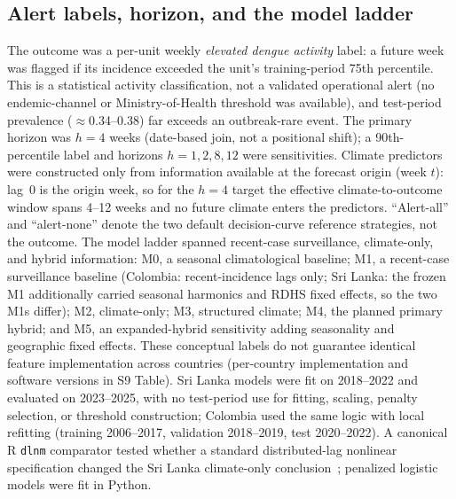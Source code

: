 \documentclass[11pt,a4paper]{article}
\begin{document}
\subsection{Alert labels, horizon, and the model ladder}
The outcome was a per-unit weekly \emph{elevated dengue activity} label: a future week was flagged if its incidence exceeded the unit's training-period 75th percentile. This is a statistical activity classification, not a validated operational alert (no endemic-channel or Ministry-of-Health threshold was available), and test-period prevalence ($\approx$0.34--0.38) far exceeds an outbreak-rare event. The primary horizon was $h=4$ weeks (date-based join, not a positional shift); a 90th-percentile label and horizons $h=1,2,8,12$ were sensitivities. Climate predictors were constructed only from information available at the forecast origin (week $t$): lag~0 is the origin week, so for the $h=4$ target the effective climate-to-outcome window spans 4--12 weeks and no future climate enters the predictors. ``Alert-all'' and ``alert-none'' denote the two default decision-curve reference strategies, not the outcome. The model ladder spanned recent-case surveillance, climate-only, and hybrid information: M0, a seasonal climatological baseline; M1, a recent-case surveillance baseline (Colombia: recent-incidence lags only; Sri Lanka: the frozen M1 additionally carried seasonal harmonics and RDHS fixed effects, so the two M1s differ); M2, climate-only; M3, structured climate; M4, the planned primary hybrid; and M5, an expanded-hybrid sensitivity adding seasonality and geographic fixed effects. These conceptual labels do not guarantee identical feature implementation across countries (per-country implementation and software versions in S9 Table). Sri Lanka models were fit on 2018--2022 and evaluated on 2023--2025, with no test-period use for fitting, scaling, penalty selection, or threshold construction; Colombia used the same logic with local refitting (training 2006--2017, validation 2018--2019, test 2020--2022). A canonical R \texttt{dlnm} comparator tested whether a standard distributed-lag nonlinear specification changed the Sri Lanka climate-only conclusion~\cite{Gasparrini2010,Gasparrini2011}; penalized logistic models were fit in Python.
\end{document}
